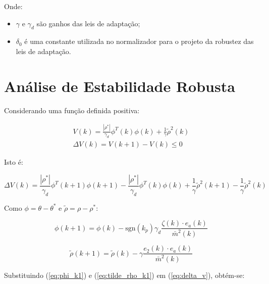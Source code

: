     Onde:

    \begin{itemize}[leftmargin=+2cm]
        \item[] $\gamma$ e $\gamma_d$ são ganhos das leis de adaptação;
        \item[] $\delta_0$ é uma constante utilizada no normalizador para o projeto
            da robustez das leis de adaptação.
    \end{itemize}

\section{Análise de Estabilidade Robusta}

    Considerando uma função definida positiva:

    \begin{equation}
        \begin{split}
            V(k) = \frac{|\rho^*|}{\gamma_d} \phi^T(k) \phi(k) + \frac{1}{\gamma} {\tilde{\rho}}^2(k) \\
            \Delta V(k) = V(k+1) - V(k) \leq 0
        \end{split}
    \end{equation}

    Isto é:

    \begin{equation}
        \Delta V(k) = \frac{|\rho^*|}{\gamma_d} \phi^T(k+1) \phi(k+1) - \frac{|\rho^*|}{\gamma_d} \phi^T(k) \phi(k)
            + \frac{1}{\gamma} {\tilde{\rho}}^2(k+1) - \frac{1}{\gamma} {\tilde{\rho}}^2(k)
        \label{eq:delta_v}
    \end{equation}

    Como $\phi = \theta - \theta^*$ e $\tilde{\rho} = \rho - \rho^*$:

    \begin{equation}
        \phi(k+1) = \phi(k) - \mathrm{sgn}(k_p) \gamma_d \frac{\zeta(k) \cdot e_a(k)}{{\bar{m}}^2(k)}
        \label{eq:phi_k1}
    \end{equation}

    \begin{equation}
        \tilde{\rho}(k+1) = \tilde{\rho}(k) - \gamma \frac{e_2(k) \cdot e_a(k)}{{\bar{m}}^2(k)}
        \label{eq:tilde_rho_k1}
    \end{equation}

    Substituindo (\ref{eq:phi_k1}) e (\ref{eq:tilde_rho_k1}) em (\ref{eq:delta_v}), obtém-se:

